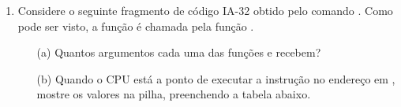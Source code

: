 \begin{enumerate}
    \item
    Considere o seguinte fragmento de código IA-32 obtido pelo comando .
    Como pode ser visto, a função  é chamada pela função .

    \begin{itemize}
        \item [(a)]
        Quantos argumentos cada uma das funções  e  recebem?
        
        \item [(b)] 
        Quando o CPU está a ponto de executar a instrução
         no endereço  em , 
        mostre os valores na pilha, preenchendo a tabela abaixo.

        \begin{figure}[H]\centering
        \end{figure}
    \end{itemize}

\end{enumerate}
